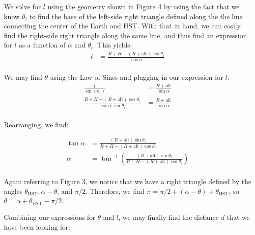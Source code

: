 \documentclass[12pt]{article}
\begin{document}
\begin{onehalfspacing}
\bigskip
\bigskip


\begin{figure}

\end{figure}

We solve for $l$ using the geometry shown in Figure 4 by using the fact that we know $\theta_i$ to find the base of the left-side right triangle defined along the the line connecting the center of the Earth and HST. With that in hand, we can easily find the right-side right triangle along the same line, and thus find an expression for $l$ as a function of $\alpha$ and $\theta_i$. This yields:
\begin{align*}
  l &= \frac{R + H - (R + \text{alt}) \cos \theta_i}{\cos \alpha} \\
\end{align*}

We may find $\theta$ using the Law of Sines and plugging in our expression for $l$:
\begin{align*}
  \frac{l}{\sin(\theta_i)} &= \frac{R + \text{alt}}{\sin \alpha} \\
  \frac{R + H - (R + \text{alt}) \cos{\theta_i}}{\cos \alpha \,\, \sin \theta_i} &= \frac{R + \text{alt}}{\sin \alpha} \\
\end{align*}

Rearranging, we find:

\begin{align*}
  \tan \alpha &= \frac{ (R + \text{alt}) \sin \theta_i}{R + H - (R + \text{alt}) \cos \theta_i} \\
  \alpha &= \tan^{-1} \left( \frac{ (R + \text{alt}) \sin \theta_i}{R + H - (R + \text{alt}) \cos \theta_i} \right) \\
\end{align*}

Again referring to Figure 3, we notice that we have a right triangle defined by the angles $\theta_{\text{HST}}, \alpha - \theta$, and $\pi/2$. Therefore, we find $\pi = \pi/2 + (\alpha - \theta) + \theta_{\text{HST}}$, so $\theta = \alpha + \theta_{\text{HST}} - \pi/2$.


Combining our expressions for $\theta$ and $l$, we may finally find the distance $d$ that we have been looking for:



\end{onehalfspacing}
\end{document}
